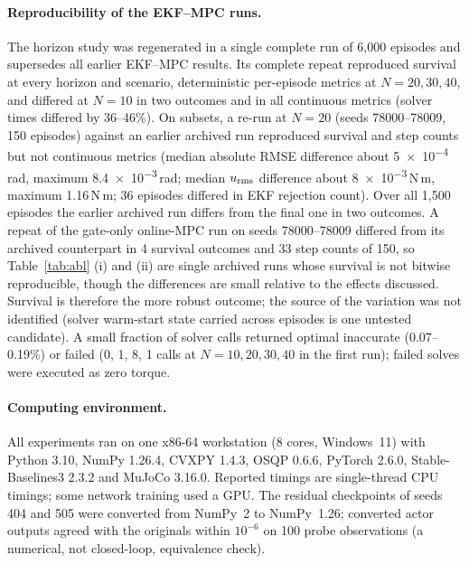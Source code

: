 \documentclass[preprint,12pt,authoryear=false]{elsarticle}
\theoremstyle{remark}\newtheorem{remark}{Remark}
\theoremstyle{plain}\newtheorem{proposition}{Proposition}\newtheorem{lemma}{Lemma}
\theoremstyle{definition}\newtheorem{assumption}{Assumption}
\begin{document}
\paragraph{Reproducibility of the EKF--MPC runs.} The horizon study was regenerated in a single complete run of 6{,}000 episodes and supersedes all earlier EKF--MPC results. Its complete repeat reproduced survival at every horizon and scenario, deterministic per-episode metrics at $N=20,30,40$, and differed at $N=10$ in two outcomes and in all continuous metrics (solver times differed by 36--46\%). On subsets, a re-run at $N=20$ (seeds 78000--78009, 150 episodes) against an earlier archived run reproduced survival and step counts but not continuous metrics (median absolute RMSE difference about \num{5e-4}\,rad, maximum \num{8.4e-3}\,rad; median $u_{\rm rms}$ difference about \num{8e-3}\,N\,m, maximum 1.16\,N\,m; 36 episodes differed in EKF rejection count). Over all 1{,}500 episodes the earlier archived run differs from the final one in two outcomes. A repeat of the gate-only online-MPC run on seeds 78000--78009 differed from its archived counterpart in 4 survival outcomes and 33 step counts of 150, so Table~\ref{tab:abl} (i) and (ii) are single archived runs whose survival is not bitwise reproducible, though the differences are small relative to the effects discussed. Survival is therefore the more robust outcome; the source of the variation was not identified (solver warm-start state carried across episodes is one untested candidate). A small fraction of solver calls returned optimal inaccurate (0.07--0.19\%) or failed (0, 1, 8, 1 calls at $N=10,20,30,40$ in the first run); failed solves were executed as zero torque.

\paragraph{Computing environment.} All experiments ran on one x86-64 workstation (8 cores, Windows~11) with Python 3.10, NumPy 1.26.4, CVXPY 1.4.3, OSQP 0.6.6, PyTorch 2.6.0, Stable-Baselines3 2.3.2 and MuJoCo 3.16.0. Reported timings are single-thread CPU timings; some network training used a GPU. The residual checkpoints of seeds 404 and 505 were converted from NumPy~2 to NumPy~1.26; converted actor outputs agreed with the originals within $10^{-6}$ on 100 probe observations (a numerical, not closed-loop, equivalence check).

\end{document}

